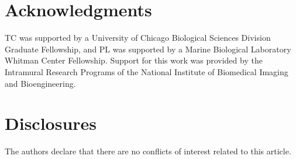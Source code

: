 \documentclass[]{osa-article}
\begin{document}
\section*{Acknowledgments}
TC was supported by a
University of Chicago Biological Sciences Division Graduate Fellowship, and PL
was supported by a Marine Biological Laboratory Whitman Center Fellowship.
Support for this work was provided by the Intramural Research Programs of the
National Institute of Biomedical Imaging and Bioengineering.

\section*{Disclosures}
The authors declare that there are no conflicts of interest related to this article.
\end{document}
